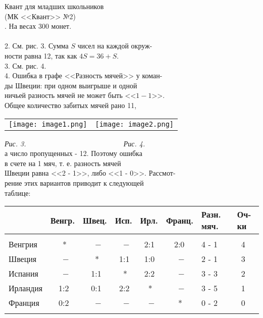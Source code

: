 \noindent Квант для младших школьников\\
(МК <<Квант>> №2)\\ 

. На весах 300 монет.\\ \\ 
2. См. рис. 3. Сумма $S$ чисел на каждой окруж-\\ности равна 12, так как $4S=36+S$.\\
3. См. рис. 4.\\
4. Ошибка в графе <<Разность мячей>> у коман-\\ ды Швеции: при одном выигрыше и одной\\
ничьей разность мячей не может быть <<$1-1$>>.\\ Общее количество забитых мячей рано 11,\\


\begin{table}[t]
\begin{tabular}{ll}
    \texttt{[image: image1.png]} & \texttt{[image: image2.png]}\\
\end{tabular}
\end{table}
\noindent\textit{Рис. 3.\ \ \ \ \ \ \ \ \ \ \ \ \ \ \ \ \ \ \ \ \ \ \ \ \ \ \ Рис. 4.}\\

\noindent а число пропущенных - 12. Поэтому ошибка\\
в счете на 1 мяч, т. е. разность мячей\\
Швеции равна <<2 - 1>>, либо <<1 - 0>>. Рассмот-\\
рение этих вариантов приводит к следующей\\
таблице:


\begin{table}[h]
{\footnotesize
\begin{tabular}{|p{1.2cm}|p{0.7cm}|p{0.7cm}|p{0.45cm}|p{0.45cm}|p{0.8cm}|p{0.55cm}|p{0.35cm}|}
    \hline
        & Венгр. & Швец. & Исп. & Ирл. & Франц. & Разн. мяч. & Оч-ки\\
    \hline
    &&&&&&&\\ 
    Венгрия &\ \ \ *    &\ \ \ $-$ &\ \ $-$ &\ 2:1   &\ \ 2:0     & 4 - 1 &\ 4\\
    Швеция  &\ \ \ $-$   &\ \ \ *   &\ 1:1   &\ 1:0   &\ \ \ $-$   & 2 - 1 &\ 3\\
    Испания &\ \ \ $-$ &\ \ 1:1   &\ \  *  &\ 2:2   &\ \ \ $-$   & 3 - 3 &\ 2\\
    Ирландия &\ \ 1:2   &\ \ 0:1   &\ 2:2   &\ \ *   &\ \ \ $-$   & 3 - 5 &\ 1\\
    Франция &\ \  0:2   &\ \ \ $-$ &\ \ $-$ &\ \ $-$ &\ \ \ *     & 0 - 2 &\ 0\\ 
    &&&&&&&\\
    \hline
\end{tabular}
}
\end{table}


